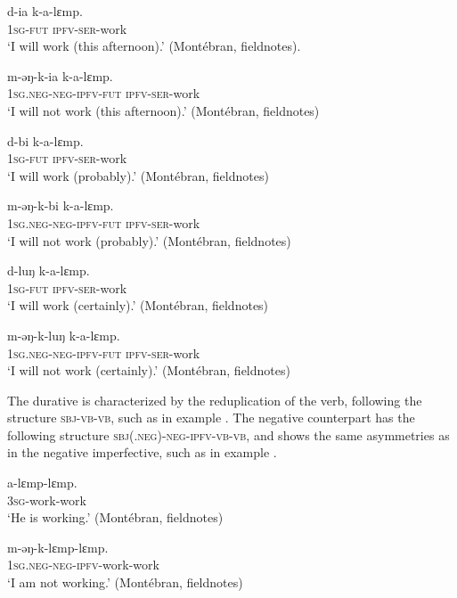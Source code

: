 \documentclass[output=paper,colorlinks,citecolor=brown]{langscibook}
\begin{document}
\ea\label{ex:mank:9} 
    \gll d-ia k-a-lɛmp.\\
         \textsc{1sg-fut} \textsc{ipfv-ser}-work\\
    \glt ‘I will work (this afternoon).’ (Montébran, fieldnotes).
\z

\ea\label{ex:mank:10}
    \gll m-əŋ-k-ia k-a-lɛmp. \\
        \textsc{1sg.neg-neg-ipfv-fut} \textsc{ipfv-ser}-work \\
    \glt ‘I will not work (this afternoon).’ (Montébran, fieldnotes)
\z

\ea\label{ex:mank:11}
    \gll d-bi k-a-lɛmp.\\
         \textsc{1sg-fut} \textsc{ipfv-ser}-work\\
    \glt ‘I will work (probably).’ (Montébran, fieldnotes)
\z

\ea\label{ex:mank:12}
    \gll m-əŋ-k-bi k-a-lɛmp. \\
         \textsc{1sg.neg-neg-ipfv-fut} \textsc{ipfv-ser}-work \\
    \glt ‘I will not work (probably).’ (Montébran, fieldnotes)
\z 

\ea\label{ex:mank:13}
    \gll d-luŋ k-a-lɛmp. \\
         \textsc{1sg-fut} \textsc{ipfv-ser}-work\\
    \glt ‘I will work (certainly).’ (Montébran, fieldnotes)
\z

\ea\label{ex:mank:14}
    \gll m-əŋ-k-luŋ k-a-lɛmp.\\
         \textsc{1sg.neg-neg-ipfv-fut} \textsc{ipfv-ser}-work\\ 
    \glt ‘I will not work (certainly).’ (Montébran, fieldnotes)
\z

The durative is characterized by the reduplication of the verb, following the structure \textsc{sbj-vb-vb}, such as in example . The negative counterpart has the following structure \textsc{sbj(.neg){}-neg-ipfv-vb-vb}, and shows the same asymmetries as in the negative imperfective, such as in example .

\ea\label{ex:mank:15}
    \gll a-lɛmp-lɛmp. \\
         \textsc{3sg}-work-work\\
    \glt ‘He is working.’ (Montébran, fieldnotes)
\z

\ea\label{ex:mank:16}
    \gll m-əŋ-k-lɛmp-lɛmp.\\
         \textsc{1sg.neg-neg-ipfv}-work-work \\
    \glt ‘I am not working.’ (Montébran, fieldnotes)
    \z
\end{document}
